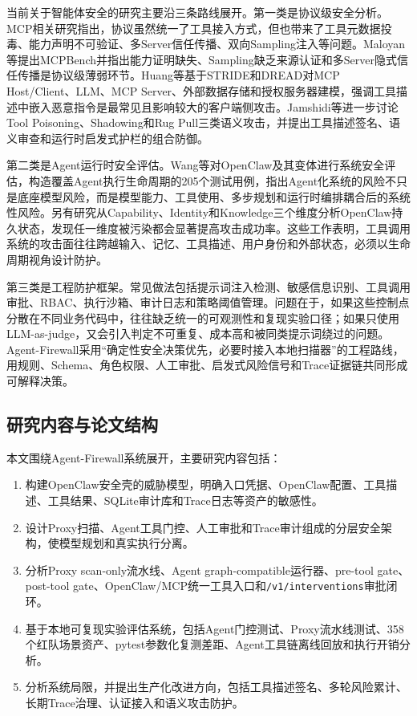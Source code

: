 \documentclass[UTF8,zihao=-4,scheme=chinese,fontset=none]{ctexart}
\newcommand{\code}[1]{{\ttfamily\small\nolinkurl{#1}}}
\begin{document}
当前关于智能体安全的研究主要沿三条路线展开。第一类是协议级安全分析。MCP相关研究指出，协议虽然统一了工具接入方式，但也带来了工具元数据投毒、能力声明不可验证、多Server信任传播、双向Sampling注入等问题。Maloyan等提出MCPBench并指出能力证明缺失、Sampling缺乏来源认证和多Server隐式信任传播是协议级薄弱环节\cite{maloyan2026breaking}。Huang等基于STRIDE和DREAD对MCP Host/Client、LLM、MCP Server、外部数据存储和授权服务器建模，强调工具描述中嵌入恶意指令是最常见且影响较大的客户端侧攻击\cite{huang2026mcp}。Jamshidi等进一步讨论Tool Poisoning、Shadowing和Rug Pull三类语义攻击，并提出工具描述签名、语义审查和运行时启发式护栏的组合防御\cite{jamshidi2025securing}。

第二类是Agent运行时安全评估。Wang等对OpenClaw及其变体进行系统安全评估，构造覆盖Agent执行生命周期的205个测试用例，指出Agent化系统的风险不只是底座模型风险，而是模型能力、工具使用、多步规划和运行时编排耦合后的系统性风险\cite{wang2026systematic}。另有研究从Capability、Identity和Knowledge三个维度分析OpenClaw持久状态，发现任一维度被污染都会显著提高攻击成功率\cite{wang2026asset}。这些工作表明，工具调用系统的攻击面往往跨越输入、记忆、工具描述、用户身份和外部状态，必须以生命周期视角设计防护。

第三类是工程防护框架。常见做法包括提示词注入检测、敏感信息识别、工具调用审批、RBAC、执行沙箱、审计日志和策略阈值管理\cite{owasp2025}。问题在于，如果这些控制点分散在不同业务代码中，往往缺乏统一的可观测性和复现实验口径；如果只使用LLM-as-judge，又会引入判定不可重复、成本高和被同类提示词绕过的问题。Agent-Firewall采用“确定性安全决策优先，必要时接入本地扫描器”的工程路线，用规则、Schema、角色权限、人工审批、启发式风险信号和Trace证据链共同形成可解释决策。

\subsection{研究内容与论文结构}

本文围绕Agent-Firewall系统展开，主要研究内容包括：

\begin{enumerate}[label=（\arabic*）]
  \item 构建OpenClaw安全壳的威胁模型，明确入口凭据、OpenClaw配置、工具描述、工具结果、SQLite审计库和Trace日志等资产的敏感性。
  \item 设计Proxy扫描、Agent工具门控、人工审批和Trace审计组成的分层安全架构，使模型规划和真实执行分离。
  \item 分析Proxy scan-only流水线、Agent graph-compatible运行器、pre-tool gate、post-tool gate、OpenClaw/MCP统一工具入口和\code{/v1/interventions}审批闭环。
  \item 基于本地可复现实验评估系统，包括Agent门控测试、Proxy流水线测试、358个红队场景资产、pytest参数化复测差距、Agent工具链离线回放和执行开销分析。
  \item 分析系统局限，并提出生产化改进方向，包括工具描述签名、多轮风险累计、长期Trace治理、认证接入和语义攻击防护。
\end{enumerate}
\end{document}
